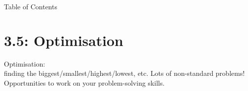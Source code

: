 

\begin{frame}{Table of Contents}

\mapofcontentsC{\ce}
\end{frame}

\section{3.5: Optimisation}
\begin{frame}
Optimisation:\\
finding the biggest/smallest/highest/lowest, etc.\pause
\vfill
Lots of non-standard problems! Opportunities to work on your problem-solving skills.
\end{frame}

